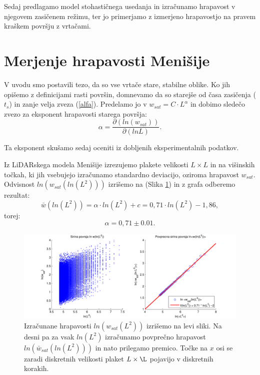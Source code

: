 \documentclass[a4paper, twoside, 12pt]{book}
\begin{document}
Sedaj predlagamo model stohastičnega usedanja in izračunamo hrapavost v njegovem zasičenem režimu, ter jo primerjamo z izmerjeno hrapavostjo na pravem kraškem površju z vrtačami.

\section{Merjenje hrapavosti Menišije}
\label{hrapavost}

V uvodu smo postavili tezo, da so vse vrtače stare, stabilne oblike. Ko jih opišemo z definicijami rasti površin, domnevamo da so starejše od časa zasičenja ($t_s$) in zanje velja zveza (\ref{alfa}). Predelamo jo v $ w_{sat}=C \cdot L^\alpha $ in dobimo sledečo zvezo za eksponent hrapavosti starega površja:
    \begin{equation}
      \alpha = \frac{\partial ( ln (w_{sat}) ) }{\partial ( ln L )}.
      \label{alpha-numeric}
    \end{equation}

Ta eksponent skušamo sedaj oceniti iz dobljenih eksperimentalnih podatkov.

Iz LiDARskega modela Menišije izrezujemo plakete velikosti $L\times L$ in na višinskih točkah, ki jih vsebujejo izračunamo standardno deviacijo, oziroma hrapavost ${w}_{sat}$. Odvisnost $ln(w_{sat}(ln(L^2)))$ izrišemo na (Slika \ref{fig:menisija-alfa}) in z grafa odberemo rezultat:
\begin{equation}
  \bar w(ln(L^2)) = \alpha \cdot ln(L^2) + c = 0,71 \cdot  ln(L^2) - 1,86,
\end{equation}
torej:
\begin{equation}
  \alpha =  0,71 \pm 0.01.
\end{equation}
\begin{figure}[h!]
  \begin{center}
    \includegraphics[width=14.5cm]{slike/menisija-alfa-3d.pdf}
  \end{center}
  \caption{Izračunane hrapavosti $ln({w}_{sat}(L^2))$ izrišemo na levi sliki. Na desni pa za vsak $ln(L^2)$ izračunamo povprečno hrapavost $ln(\bar w_{sat}(ln(L^2)))$ in nato prilegamo premico. Točke na $x$ osi se zaradi diskretnih velikosti plaket $L\times\L$ pojavijo v diskretnih korakih.}
  \label{fig:menisija-alfa}
\end{figure}
\end{document}
